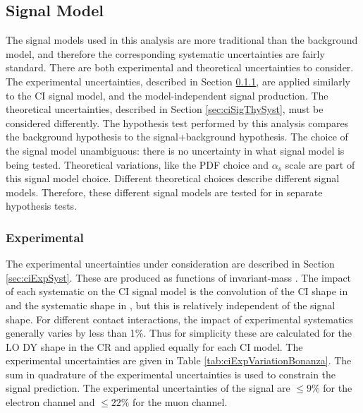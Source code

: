 \subsection{Signal Model}\label{sec:ciSystSig}
The signal models used in this analysis are more traditional than the background model, and therefore the corresponding systematic uncertainties are fairly standard.
There are both experimental and theoretical uncertainties to consider.
The experimental uncertainties, described in Section \ref{sec:ciSigExpSyst}, are applied similarly to the CI signal model, and the model-independent signal production.
The theoretical uncertainties, described in Section \ref{sec:ciSigThySyst}, must be considered differently.
The hypothesis test performed by this analysis compares the background hypothesis to the signal+background hypothesis.
The choice of the signal model unambiguous: there is no uncertainty in what signal model is being tested.
Theoretical variations, like the PDF choice and $\alpha_s$ scale are part of this signal model choice.
Different theoretical choices describe different signal models.
Therefore, these different signal models are tested for in separate hypothesis tests.

\subsubsection{Experimental}\label{sec:ciSigExpSyst}

The experimental uncertainties under consideration are described in Section \ref{sec:ciExpSyst}.
These are produced as functions of invariant-mass \mll.
The impact of each systematic on the CI signal model is the convolution of the CI shape in \mll and the systematic shape in \mll, but this is relatively independent of the signal shape.
For different contact interactions, the impact of experimental systematics generally varies by less than 1\%.
Thus for simplicity these are calculated for the LO DY shape in the CR and applied equally for each CI model.
The experimental uncertainties are given in Table \ref{tab:ciExpVariationBonanza}.
The sum in quadrature of the experimental uncertainties is used to constrain the signal prediction.
The experimental uncertainties of the signal are $\leq 9\%$ for the electron channel and $\leq 22\%$ for the muon channel.


